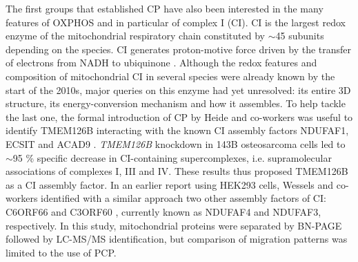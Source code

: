 The first groups that established CP have also been interested in the many features of OXPHOS and in particular of complex I (CI). CI is the largest redox enzyme of the mitochondrial respiratory chain constituted by $\sim$45 subunits depending on the species. CI generates proton-motive force driven by the transfer of electrons from NADH to ubiquinone \cite{Hirst_2013}. Although the redox features and composition of mitochondrial CI in several species were already known by the start of the 2010s, major queries on this enzyme had yet unresolved: its entire 3D structure, its energy-conversion mechanism and how it assembles. To help tackle the last one, the formal introduction of CP by Heide and co-workers was useful to identify TMEM126B interacting with the known CI assembly factors NDUFAF1, ECSIT and ACAD9 \cite{Heide_2012}. \emph{TMEM126B} knockdown in 143B osteosarcoma cells led to $\sim$95 \% specific decrease in CI-containing supercomplexes, i.e. supramolecular associations of complexes I, III and IV. These results thus proposed TMEM126B as a CI assembly factor. In an earlier report using HEK293 cells, Wessels and co-workers identified with a similar approach two other assembly factors of CI: C6ORF66 and C3ORF60 \cite{Wessels_2009}, currently known as NDUFAF4 and NDUFAF3, respectively. In this study, mitochondrial proteins were separated by BN-PAGE followed by LC-MS/MS identification, but comparison of migration patterns was limited to the use of PCP.\\
